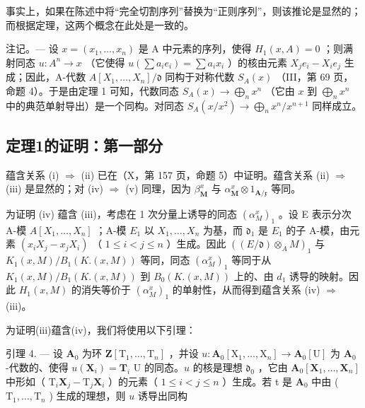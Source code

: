 事实上，如果在陈述中将“完全切割序列”替换为“正则序列”，则该推论是显然的；而根据定理，这两个概念在此处是一致的。

注记。--- 设 \(x = (x_1, \ldots, x_n)\) 是 A 中元素的序列，使得 \(H_1(x, A) = 0\) ；则满射同态 \(u: A^n \to x\) （它使得 \(u(\sum a_i e_i) = \sum a_i x_i\) ）的核由元素 \(X_j e_i - X_i e_j\) 生成；因此，A-代数 \(A[X_1, \ldots, X_n] / \mathfrak{d}\) 同构于对称代数 \(S_A(x)\) （III，第 69 页，命题 4）。于是由定理 1 可知，代数同态 \(S_A(x) \to \bigoplus_n x^n\) （它由 \(x\) 到 \(\bigoplus_n x^n\) 中的典范单射导出）是一个同构。对同态 \(S_A(x / x^2) \to \bigoplus_n x^n / x^{n+1}\) 同样成立。

\subsection{定理1的证明：第一部分}

蕴含关系 (i) \(\Rightarrow\) (ii) 已在（X，第 157 页，命题 5）中证明。蕴含关系 (ii) \(\Rightarrow\) (iii) 是显然的；对 (iv) \(\Rightarrow\) (v) 同理，因为 \(\beta_{\mathbf{M}}^{x}\) 与 \(\alpha_{\mathbf{M}}^{x} \otimes 1_{\mathbf{A}/\mathfrak{x}}\) 等同。

为证明 (iv) 蕴含 (iii)，考虑在 1 次分量上诱导的同态 \((\alpha_{M}^{x})_{1}\) 。设 E 表示分次 A-模 \(A[X_{1},\ldots,X_{n}]\) ；A-模 \(E_{1}\) 以 \(X_{1},\ldots,X_{n}\) 为基，而 \(\mathfrak{d}_{1}\) 是 \(E_{1}\) 的子 A-模，由元素 \((x_{i}X_{j}-x_{j}X_{i})\) （ \(1\leqslant i<j\leqslant n\) ）生成。因此 \(((E/\mathfrak{d})\otimes_{A}M)_{1}\) 与 \(K_{1}(x,M)/B_{1}(K.(x,M))\) 等同，同态 \((\alpha_{M}^{x})_{1}\) 等同于从 \(K_{1}(x,M)/B_{1}(K.(x,M))\) 到 \(B_{0}(K.(x,M))\) 上的、由 \(d_{1}\) 诱导的映射。因此 \(H_{1}(x,M)\) 的消失等价于 \((\alpha_{M}^{x})_{1}\) 的单射性，从而得到蕴含关系 (iv) \(\Rightarrow\) (iii)。

为证明(iii)蕴含(iv)，我们将使用以下引理：

引理 4. --- 设 \(\mathbf{A}_{0}\) 为环 \(\mathbf{Z}[\mathrm{T}_{1},\ldots,\mathrm{T}_{n}]\) ，并设 \(u:\mathbf{A}_{0}[\mathrm{X}_{1},\ldots,\mathrm{X}_{n}] \to \mathbf{A}_{0}[\mathrm{U}]\) 为 \(\mathbf{A}_{0}\) -代数的、使得 \(u(\mathbf{X}_{i}) = \mathbf{T}_{i}\) U 的同态。\(u\) 的核是理想 \(\mathfrak{d}_{0}\) ，它由 \(\mathbf{A}_{0}[\mathbf{X}_{1},\ldots,\mathbf{X}_{n}]\) 中形如（ \(\mathrm{T}_{i}\mathbf{X}_{j}-\mathrm{T}_{j}\mathbf{X}_{i}\) ）的元素（ \(1 \leqslant i < j \leqslant n\) ）生成。若 t 是 \(\mathbf{A}_{0}\) 中由 ( \(\mathrm{T}_{1},\ldots,\mathrm{T}_{n}\) ) 生成的理想，则 \(u\) 诱导出同构

